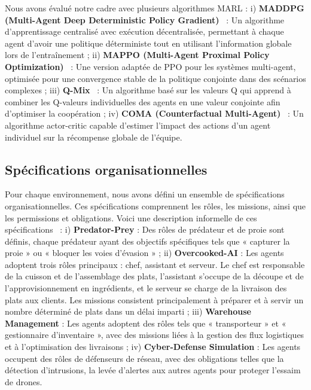 \documentclass[dissemination]{jfsma}
\begin{document}
Nous avons évalué notre cadre avec plusieurs algorithmes MARL :
i) \textbf{MADDPG (Multi-Agent Deep Deterministic Policy Gradient)}~\cite{lowe2017multi} : Un algorithme d'apprentissage centralisé avec exécution décentralisée, permettant à chaque agent d'avoir une politique déterministe tout en utilisant l'information globale lors de l'entraînement
 ; \quad
ii) \textbf{MAPPO (Multi-Agent Proximal Policy Optimization)}~\cite{yu2021mappo} : Une version adaptée de PPO pour les systèmes multi-agent, optimisée pour une convergence stable de la politique conjointe dans des scénarios complexes
; \quad
iii) \textbf{Q-Mix}~\cite{rashid2018qmix} : Un algorithme basé sur les valeurs Q qui apprend à combiner les Q-valeurs individuelles des agents en une valeur conjointe afin d'optimiser la coopération
; \quad
iv) \textbf{COMA (Counterfactual Multi-Agent)}~\cite{foerster2018counterfactual} : Un algorithme actor-critic capable d'estimer l'impact des actions d'un agent individuel sur la récompense globale de l'équipe.

\subsection{Spécifications organisationnelles}

Pour chaque environnement, nous avons défini un ensemble de spécifications organisationnelles. Ces spécifications comprennent les rôles, les missions, ainsi que les permissions et obligations. Voici une description informelle de ces spécifications~\hyperref[fn:github]{\footnotemark[1]} :
%
i) \textbf{Predator-Prey} : Des rôles de prédateur et de proie sont définis, chaque prédateur ayant des objectifs spécifiques tels que « capturer la proie » ou « bloquer les voies d'évasion »
; \quad
ii) \textbf{Overcooked-AI} : Les agents adoptent trois rôles principaux : chef, assistant et serveur. Le chef est responsable de la cuisson et de l'assemblage des plats, l'assistant s'occupe de la découpe et de l'approvisionnement en ingrédients, et le serveur se charge de la livraison des plats aux clients. Les missions consistent principalement à préparer et à servir un nombre déterminé de plats dans un délai imparti
; \quad
iii) \textbf{Warehouse Management} : Les agents adoptent des rôles tels que « transporteur » et « gestionnaire d'inventaire », avec des missions liées à la gestion des flux logistiques et à l'optimisation des livraisons
; \quad
iv) \textbf{Cyber-Defense Simulation} : Les agents occupent des rôles de défenseurs de réseau, avec des obligations telles que la détection d'intrusions, la levée d'alertes aux autres agents pour proteger l'essaim de drones.
\end{document}
